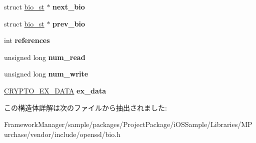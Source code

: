 \begin{DoxyCompactItemize}
\item 
\hypertarget{structbio__st_adf41b29002a5236e8112253dd9d8acbf}{}struct \hyperlink{structbio__st}{bio\+\_\+st} $\ast$ {\bfseries next\+\_\+bio}\label{structbio__st_adf41b29002a5236e8112253dd9d8acbf}

\item 
\hypertarget{structbio__st_a86fd505e8e4af7bb98312d707ee9d170}{}struct \hyperlink{structbio__st}{bio\+\_\+st} $\ast$ {\bfseries prev\+\_\+bio}\label{structbio__st_a86fd505e8e4af7bb98312d707ee9d170}

\item 
\hypertarget{structbio__st_a6b72d783529f2185bb1c452ab6845d5e}{}int {\bfseries references}\label{structbio__st_a6b72d783529f2185bb1c452ab6845d5e}

\item 
\hypertarget{structbio__st_ab70dbdf7e557e771f49b12df73e6a91e}{}unsigned long {\bfseries num\+\_\+read}\label{structbio__st_ab70dbdf7e557e771f49b12df73e6a91e}

\item 
\hypertarget{structbio__st_a3b884313deeabd3eb35e693394937a0e}{}unsigned long {\bfseries num\+\_\+write}\label{structbio__st_a3b884313deeabd3eb35e693394937a0e}

\item 
\hypertarget{structbio__st_a499ee1071ec22ec4da6086422785a0ca}{}\hyperlink{structcrypto__ex__data__st}{C\+R\+Y\+P\+T\+O\+\_\+\+E\+X\+\_\+\+D\+A\+T\+A} {\bfseries ex\+\_\+data}\label{structbio__st_a499ee1071ec22ec4da6086422785a0ca}

\end{DoxyCompactItemize}


この構造体詳解は次のファイルから抽出されました\+:\begin{DoxyCompactItemize}
\item 
Framework\+Manager/sample/packages/\+Project\+Package/i\+O\+S\+Sample/\+Libraries/\+M\+Purchase/vendor/include/openssl/bio.\+h\end{DoxyCompactItemize}
